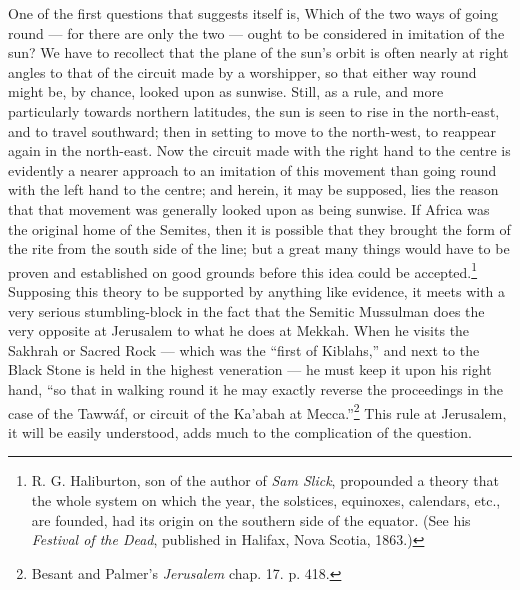 \documentclass[a4paper, 11pt, oneside, polutonikogreek, english]{article}
\begin{document}
One of the first questions that suggests itself is, Which of the two ways of going round --- for there are only the two --- ought to be considered in imitation of the sun? We have to recollect that the plane of the sun's orbit is often nearly at right angles to that of the circuit made by a worshipper, so that either way round might be, by chance, looked upon as sunwise. Still, as a rule, and more particularly towards northern latitudes, the sun is seen to rise in the north-east, and to travel southward; then in setting to move to the north-west, to reappear again in the north-east. Now the circuit made with the right hand to the centre is evidently a nearer approach to an imitation of this movement than going round with the left hand to the centre; and herein, it may be supposed, lies the reason that that movement was generally looked upon as being sunwise. If Africa was the original home of the Semites, then it is possible that they brought the form of the rite from the south side of the line; but a great many things would have to be proven and established on good grounds before this idea could be accepted.\footnote{R. G. Haliburton, son of the author of \emph{Sam Slick}, propounded a theory that the whole system on which the year, the solstices, equinoxes, calendars, etc., are founded, had its origin on the southern side of the equator. (See his \emph{Festival of the Dead}, published in Halifax, Nova Scotia, 1863.)} Supposing this theory to be supported by anything like evidence, it meets with a very serious stumbling-block in the fact that the Semitic Mussulman does the very opposite at Jerusalem to what he does at Mekkah. When he visits the Sakhrah or Sacred Rock --- which was the ``first of Kiblahs,'' and next to the Black Stone is held in the highest veneration --- he must keep it upon his right hand, ``so that in walking round it he may exactly reverse the proceedings in the case of the Tawwáf, or circuit of the Ka'abah at Mecca.''\footnote{Besant and Palmer's \emph{Jerusalem} chap. 17. p. 418.} This rule at Jerusalem, it will be easily understood, adds much to the complication of the question.
\end{document}
